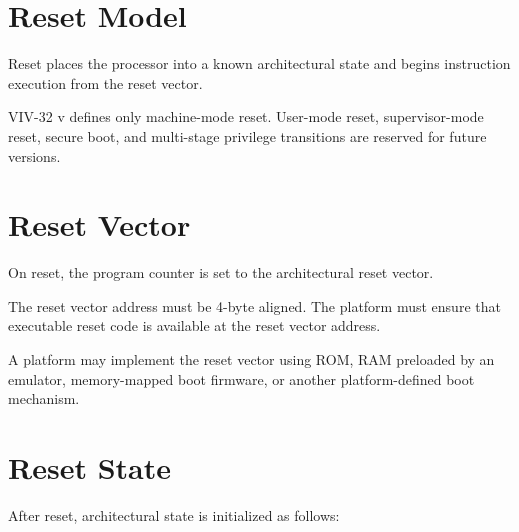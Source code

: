 \section{Reset Model}

Reset places the processor into a known architectural state and begins instruction execution
from the reset vector.

VIV-32 v\version{} defines only machine-mode reset. User-mode reset, supervisor-mode
reset, secure boot, and multi-stage privilege transitions are reserved for future versions.

\section{Reset Vector}

On reset, the program counter is set to the architectural reset vector.

\begin{center}
\end{center}

\noindent
The reset vector address must be 4-byte aligned. The platform must ensure that
executable reset code is available at the reset vector address.

\noindent
A platform may implement the reset vector using ROM, RAM preloaded by an
emulator, memory-mapped boot firmware, or another platform-defined boot mechanism.

\section{Reset State}

After reset, architectural state is initialized as follows:

